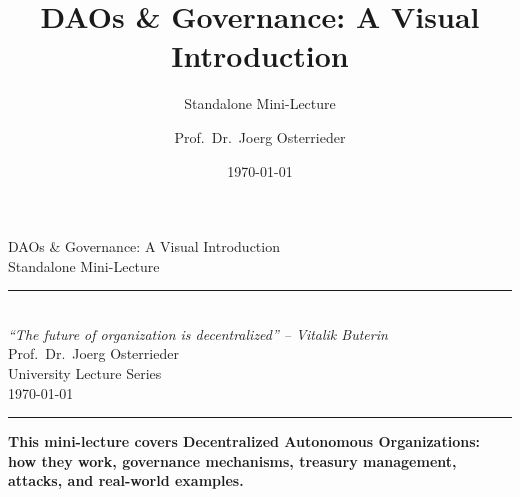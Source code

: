 \documentclass[8pt,aspectratio=169]{beamer}
\title{DAOs \& Governance: A Visual Introduction}
\subtitle{Standalone Mini-Lecture}
\author{Prof.~Dr.~Joerg Osterrieder}
\institute{University Lecture Series}
\date{\today}
\newcommand{\bottomnote}[1]{%
\vfill
\vspace{-2mm}
\textcolor{mllavender2}{\rule{\textwidth}{0.4pt}}
\vspace{1mm}
\footnotesize
\textbf{#1}
}
\begin{document}
\begin{frame}[plain]
\vspace{2cm}
\begin{center}
{\Huge\color{mlpurple} DAOs \& Governance: A Visual Introduction}\\[0.4cm]
{\Large\color{mlblue} Standalone Mini-Lecture}\\[0.3cm]
\textcolor{mlgray}{\rule{6cm}{0.4pt}}\\[0.3cm]
{\small\itshape ``The future of organization is decentralized'' -- Vitalik Buterin}\\[1.5cm]
{\normalsize Prof.~Dr.~Joerg Osterrieder}\\[0.2cm]
{\small University Lecture Series}\\[0.2cm]
{\small \today}
\end{center}

\bottomnote{This mini-lecture covers Decentralized Autonomous Organizations: how they work, governance mechanisms, treasury management, attacks, and real-world examples.}
\end{frame}
\end{document}
